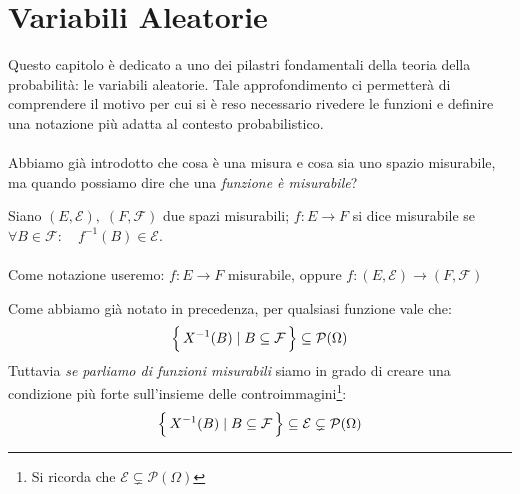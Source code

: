 \chapter{Variabili Aleatorie}

Questo capitolo è dedicato a uno dei pilastri fondamentali della teoria della probabilità: le variabili aleatorie. Tale approfondimento ci permetterà di comprendere il motivo per cui si è reso necessario rivedere le funzioni e definire una notazione più adatta al contesto probabilistico.\\
\\
Abbiamo già introdotto che cosa è una misura e cosa sia uno spazio misurabile, ma quando possiamo dire che una \textit{funzione è misurabile}?
\begin{definizione}
    Siano $(E, \mathcal{E}), \;(F, \mathcal{F})$ due spazi misurabili; $f:E\to F$ si dice misurabile se $\forall B\in\mathcal{F}:\quad f^{-1}(B)\in \mathcal{E}$.\\
    \\
    Come notazione useremo: $f:E\to F$ misurabile, oppure $f:(E, \mathcal{E})\to (F, \mathcal{F})$
\end{definizione}
\noindent Come abbiamo già notato in precedenza, per qualsiasi funzione vale che:
\[\Bigl\{\,X^{-1}(B)\mid B\subseteq \mathcal{F}\,\Bigr\}\subseteq \mathcal{P}(\Omega)\]
Tuttavia \textit{se parliamo di funzioni misurabili} siamo in grado di creare una condizione più forte sull'insieme delle controimmagini\footnote{Si ricorda che $\mathcal{E}\subsetneq \mathcal{P}(\Omega)$}:
\[\Bigl\{\,X^{-1}(B)\mid B\subseteq \mathcal{F}\,\Bigr\}\subseteq \mathcal{E}\subsetneq \mathcal{P}(\Omega)\]

